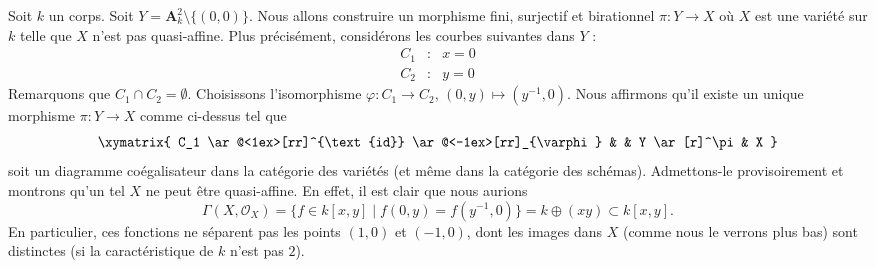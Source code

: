 \medskip\noindent
Soit $k$ un corps.
Soit $Y = \mathbf{A}^2_k \setminus \{(0, 0)\}$.
Nous allons construire un morphisme fini, surjectif et birationnel
$\pi : Y \longrightarrow X$
où $X$ est une variété sur $k$ telle que $X$ n'est pas quasi-affine.
Plus précisément, considérons les courbes suivantes dans $Y$ :
$$
\begin{matrix}
C_1 & : & x = 0 \\
C_2 & : & y = 0
\end{matrix}
$$
Remarquons que $C_1 \cap C_2 = \emptyset$. Choisissons l'isomorphisme
$\varphi : C_1 \to C_2$, $(0, y) \mapsto (y^{-1}, 0)$.
Nous affirmons qu'il existe un unique morphisme $\pi : Y \to X$ comme ci-dessus
tel que
$$
\xymatrix{
C_1
\ar@<1ex>[rr]^{\text{id}} \ar@<-1ex>[rr]_{\varphi}
& &
Y \ar[r]^\pi & X
}
$$
soit un diagramme coégalisateur dans la catégorie des variétés (et même dans
la catégorie des schémas). Admettons-le provisoirement et
montrons qu'un tel $X$ ne peut être quasi-affine. En effet, il est clair
que nous aurions
$$
\Gamma(X, \mathcal{O}_X) =
\{ f \in k[x, y] \mid f(0, y) = f(y^{-1}, 0)\} =
k \oplus (xy) \subset k[x, y].
$$
En particulier, ces fonctions ne séparent pas les points $(1, 0)$
et $(-1, 0)$, dont les images dans $X$ (comme nous le verrons plus bas) sont distinctes
(si la caractéristique de $k$ n'est pas $2$).

